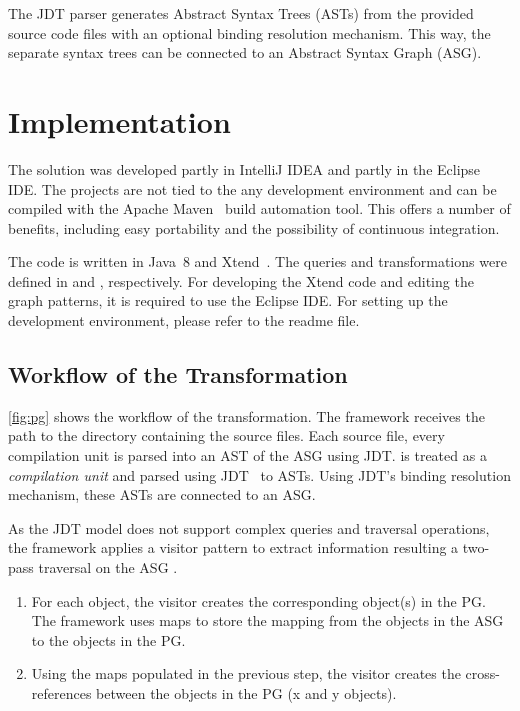 \documentclass[submission,copyright,creativecommons]{eptcs}
\begin{document}
The JDT parser generates Abstract Syntax Trees (ASTs) from the provided source code files with an optional binding resolution mechanism. This way, the separate syntax trees can be connected to an Abstract Syntax Graph (ASG).



\section{Implementation}

The solution was developed partly in IntelliJ IDEA and partly in the Eclipse IDE. The projects are not tied to the any development environment and can be compiled with the Apache Maven~\cite{Maven} build automation tool. This offers a number of benefits, including easy portability and the possibility of continuous integration.

The code is written in Java~8 and Xtend~\cite{Xtend}. The queries and transformations were defined in \eiq and \viatra, respectively. For developing the Xtend code and editing the graph patterns, it is required to use the Eclipse IDE. For setting up the development environment, please refer to the readme file. 

\subsection{Workflow of the Transformation}


\autoref{fig:pg} shows the workflow of the transformation. The framework receives the path to the directory containing the source files. Each source file, every compilation unit is parsed into an AST of the ASG using JDT. is treated as a \emph{compilation unit} and parsed using JDT~ to ASTs. Using JDT's binding resolution mechanism, these ASTs are connected to an ASG.

As the JDT model does not support complex queries and traversal operations, the framework applies a visitor pattern to extract information resulting a two-pass traversal on the ASG .

\begin{enumerate}[noitemsep]
\item For each object, the visitor creates the corresponding object(s) in the PG. The framework uses maps to store the mapping from the objects in the ASG to the objects in the PG.
\item Using the maps populated in the previous step, the visitor creates the cross-references between the objects in the PG (\eg x and y objects).
\end{enumerate}
\end{document}
